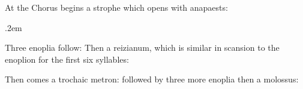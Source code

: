 \documentclass[11pt]{report}
\renewcommand{\(}{\begin{metrike}}
\renewcommand{\)}{\end{metrike}}
\newcommand{\dactyl}{\metra{\m\b\b}}
\newcommand{\spondee}{\metra{\m\m}}
\newcommand{\enoplion}{\metra{\m\m\b\b\m\b\m\m}}
\begin{document}
At  the Chorus begins a strophe which opens with
anapaests:\par
\vspace{1ex}
{%
\tabskip .2em %
\halign {%
\hspace*{2em}#\hspace*{4em}&&#\hfill\cr%
\oldstylenums{148}&\dactyl &\spondee &\spondee &\spondee \cr
&\spondee &\spondee &\spondee &\spondee\cr
&\spondee &\spondee \cr
}%
}

Three enoplia follow:{\obeylines
\hspace{6.25em}\enoplion
\hspace{6.25em}\enoplion
\hspace{6.25em}\enoplion
}
Then a reizianum, which is similar in scansion to the enoplion
for the first six syllables:{\obeylines
\hspace{6.25em}\metra{\m\m\b\b\m\m}
}

Then comes a trochaic metron:{\obeylines
\hspace{6.25em}\metra{\m\b\m\b}
}\noindent followed by three more enoplia{\obeylines
\hspace{6.25em}\enoplion
\hspace{6.25em}\enoplion
\hspace{6.25em}\enoplion
}\noindent then a molossus:{\obeylines
\hspace{6.25em}\metra{\m\m\m}
}
\end{document}
